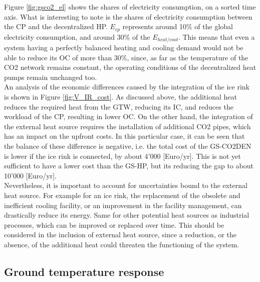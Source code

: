 \documentclass{article}
\begin{document}
Figure \ref{fig:gsco2_el} shows the shares of electricity consumption, on a sorted time axis. What is interesting to note is the shares of electricity consumption between the CP and the decentralized HP. $E_{cp}$ represents around 10\% of the global electricity consumption, and around 30\% of the $E_{heat/cool}$. This means that even a system having a perfectly balanced heating and cooling demand would not be able to reduce its OC of more than 30\%, since, as far as the temperature of the CO2 network remains constant, the operating conditions of the decentralized heat pumps remain unchanged too.\\

An analysis of the economic differences caused by the integration of the ice rink is shown in Figure \ref{fig:V_IR_cost}. As discussed above, the additional heat reduces the required heat from the GTW, reducing its IC, and reduces the workload of the CP, resulting in lower OC. On the other hand, the integration of the external heat source requires the installation of additional CO2 pipes, which has an impact on the upfront costs. In this particular case, it can be seen that the balance of these difference is negative, i.e. the total cost of the GS-CO2DEN is lower if the ice rink is connected, by about 4'000 [Euro/yr]. This is not yet sufficient to have a lower cost than the GS-HP, but its reducing the gap to about 10'000 [Euro/yr].\\

Nevertheless, it is important to account for uncertainties bound to the external heat source. For example for an ice rink, the replacement of the obsolete and inefficient cooling facility, or an improvement in the facility management, can drastically reduce its energy. Same for other potential heat sources as industrial processes, which can be improved or replaced over time. This should be considered in the inclusion of external heat source, since a reduction, or the absence, of the additional heat could threaten the functioning of the system.


\subsection{Ground temperature response}

\end{document}
